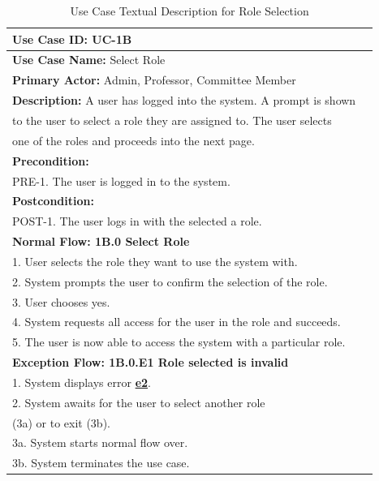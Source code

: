 \documentclass[fontsize=12pt,paper=letter,twoside]{scrartcl}
\begin{document}
\begin{table}[!htb]
\begin{center}
\begin{tabular}{|l|l|}
\hline
\textbf{Use Case ID:} UC-1B \\ \hline
\textbf{Use Case Name:} Select Role \\ \hline
\textbf {Primary Actor:} Admin, Professor, Committee Member\\ \hline
\textbf{Description:} A user has logged into the system. A prompt is shown \\to the user to select a role they are assigned to. The user selects \\one of the roles and proceeds into the next page.\\ \hline
\textbf{Precondition:}
\\ PRE-1. The user is logged in to the system. \\ \hline
\textbf{Postcondition:}
\\ POST-1. The user logs in with the selected a role. \\ \hline
\textbf{Normal Flow: 1B.0 Select Role}
\\ 1. User selects the role they want to use the system with.
\\ 2. System prompts the user to confirm the selection of the role.
\\ 3. User chooses yes.
\\ 4. System requests all access for the user in the role and succeeds.
\\ 5. The user is now able to access the system with a particular role.\\ \hline
\textbf{Exception Flow: 1B.0.E1 Role selected is invalid}
\\ 1. System displays error \hyperref[app:error]{\textbf{e2}}.
\\ 2. System awaits for the user to select another role \\(3a) or to exit (3b).
\\ 3a. System starts normal flow over.
\\ 3b. System terminates the use case.\\ \hline
\end{tabular}
\end{center}
\caption {Use Case Textual Description for Role Selection}
\label{tbl:uc1Btd}
\end{table}
\end{document}
